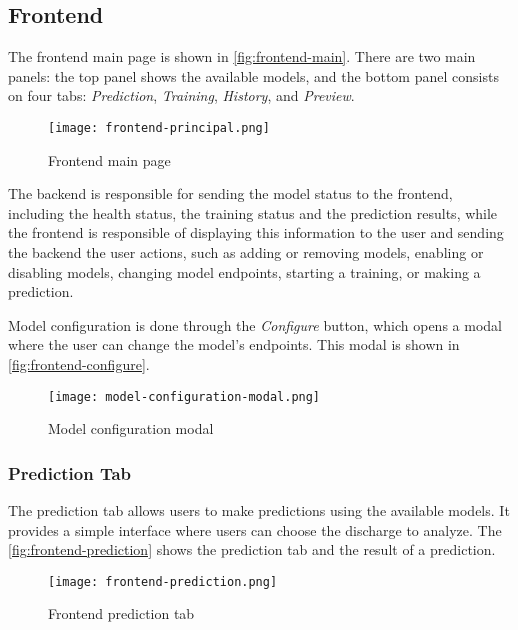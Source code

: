 \subsection{Frontend}

The frontend main page is shown in \autoref{fig:frontend-main}. There are two main panels: the top panel shows the available models, and the bottom panel consists on four tabs: \textit{Prediction}, \textit{Training}, \textit{History}, and \textit{Preview}.

\begin{figure}[H]
    \centering
    \texttt{[image: frontend-principal.png]}
    \caption{Frontend main page}
    \label{fig:frontend-main}
\end{figure}

The backend is responsible for sending the model status to the frontend, including the health status, the training status and the prediction results, while the frontend is responsible of displaying this information to the user and sending the backend the user actions, such as adding or removing models, enabling or disabling models, changing model endpoints, starting a training, or making a prediction.

Model configuration is done through the \textit{Configure} button, which opens a modal where the user can change the model's endpoints. This modal is shown in \autoref{fig:frontend-configure}.

\begin{figure}[H]
    \centering
    \texttt{[image: model-configuration-modal.png]}
    \caption{Model configuration modal}
    \label{fig:frontend-configure}
\end{figure}

\subsubsection{Prediction Tab}

The prediction tab allows users to make predictions using the available models. It provides a simple interface where users can choose the discharge to analyze. The \autoref{fig:frontend-prediction} shows the prediction tab and the result of a prediction.

\begin{figure}[H]
    \centering
    \texttt{[image: frontend-prediction.png]}
    \caption{Frontend prediction tab}
    \label{fig:frontend-prediction}
\end{figure}

